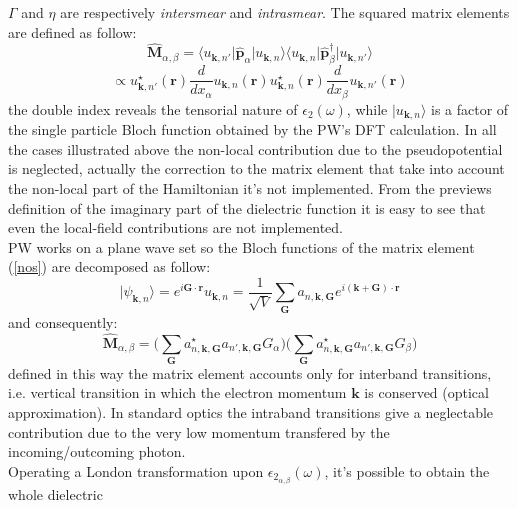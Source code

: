 \documentclass[twocolumn]{article}
\begin{document}
$\Gamma$ and $\eta$ are respectively \emph{intersmear} and \emph{intrasmear}. 
The squared matrix elements are defined as follow:
\begin{equation}
\hat{\textbf{M}}_{\alpha,\beta}=\langle u_{\textbf{k},n'}\vert\hat{\textbf{p}}_{\alpha}\vert u_{\textbf{k},n}\rangle
\langle u_{\textbf{k},n}\vert\hat{\textbf{p}}_{\beta}^{\dagger}\vert u_{\textbf{k},n'}\rangle
\label{nos}
\end{equation}
\begin{equation}
\propto u_{\textbf{k},n'}^{\star}(\textbf{r})\frac{d}{d x_{\alpha}}u_{\textbf{k},n}(\textbf{r})
u_{\textbf{k},n}^{\star}(\textbf{r})\frac{d}{d x_{\beta}}u_{\textbf{k},n'}(\textbf{r})
\end{equation}
the double index reveals the tensorial nature of $\epsilon_{2}(\omega)$, while $\vert u_{\textbf{k},n}\rangle$ is a
factor of the single particle Bloch function obtained by the PW's DFT calculation.
In all the cases illustrated above the non-local contribution due to the pseudopotential is neglected, actually the
correction to the matrix element that take into account the non-local part of the Hamiltonian it's not implemented.
From the previews definition of the imaginary part of the dielectric function it is easy to see that even the local-field
contributions are not implemented.\\
PW works on a plane wave set so the Bloch functions of the matrix element (\ref{nos}) are decomposed as follow:
\begin{equation}
\vert \psi_{\textbf{k},n}\rangle=e^{i\textbf{G}\cdot\textbf{r}}u_{\textbf{k},n}=\frac{1}{\sqrt{V}}\sum_{\textbf{G}}a_{n,\textbf{k},\textbf{G}}
e^{i(\textbf{k}+\textbf{G})\cdot\textbf{r}}
\end{equation}
and consequently:
\begin{equation}
\hat{\textbf{M}}_{\alpha,\beta}=\bigg(\sum_{\textbf{G}}a^{\star}_{n,\textbf{k},\textbf{G}}a_{n',\textbf{k},\textbf{G}}
G_{\alpha}\bigg) \bigg(\sum_{\textbf{G}}a^{\star}_{n,\textbf{k},\textbf{G}}a_{n',\textbf{k},\textbf{G}}
G_{\beta}\bigg)
\end{equation}
defined in this way the matrix element accounts only for interband transitions, i.e. vertical transition in which the
electron momentum $\textbf{k}$ is conserved (optical approximation). In standard optics the intraband transitions give a 
neglectable contribution due to the very low momentum transfered by the incoming/outcoming photon.\\
Operating a London transformation upon $\epsilon_{2_{\alpha,\beta}}(\omega)$, it's possible to obtain the whole dielectric
\end{document}
